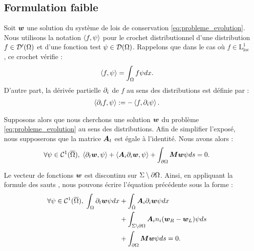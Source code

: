 \subsection{Formulation faible}
\label{ssect:formulation_faible}

Soit $\bm{w}$ une solution du système de lois de conservation \eqref{eq:probleme_evolution}.
Nous utilisons la notation $\left\langle f,\psi\right\rangle$ pour le crochet distributionnel d’une
distribution $f \in \mathcal{D}'(\Omega)$ et d’une fonction test
$\psi \in \mathcal{D}(\Omega)$.
Rappelons que dans le cas où $f \in \mathrm{L}^{1}_{\mathrm{loc}}$, ce crochet vérifie :
\begin{align}
	\left\langle f,\psi\right\rangle = \int_{\Omega} f \psi dx .
\end{align}
D’autre part, la dérivée partielle $\partial_{i}$ de $f$ au sens des distributions
est définie par :
\begin{align}
	\left\langle\partial_{i}f,\psi\right\rangle := -\left\langle f,\partial_{i}\psi\right\rangle .
\end{align}


Supposons alors que nous cherchons une solution $\bm{w}$ du problème \eqref{eq:probleme_evolution} au sens des distributions.
Afin de simplifier l’exposé, nous supposerons que la matrice
$\bm{A}_{t}$ est égale à l’identité. Nous avons alors :
\begin{align}
	\forall \psi \in \mathcal{C}^1(\overline{\Omega}), \;
	\left\langle\partial_{t}\bm{w},\psi\right\rangle + \left\langle{\bm{A}_{i}\partial_{i}}\bm{w},\psi\right\rangle
	+ \int_{\partial\Omega} \bm{M} \bm{w} \psi ds = 0 .
\end{align}

Le vecteur de fonctions $\bm{w}$ est discontinu sur $\Sigma \setminus \partial\Omega$.
Ainsi, en appliquant la formule des sauts \cite{sauts}, nous pouvons écrire l’équation
précédente sous la forme :
\begin{equation}
	\begin{aligned}
		\forall \psi \in \mathcal{C}^1(\overline{\Omega}), \;
		\int_{\Omega} \partial_{t} \bm{w} \psi dx
		&+ \int_{\tilde{\Omega}} {\bm{A}_{i}\partial_{i}} \bm{w} \psi dx \\
		&+ \int_{\Sigma \setminus \partial\Omega}
			{\bm{A}_{i}n_{i}} (\bm{w}_R - \bm{w}_L) \psi ds \\
		&+ \int_{\partial\Omega} \bm{M} \bm{w} \psi ds = 0
		\label{eq:formulation_faible} .
	\end{aligned}
\end{equation}

